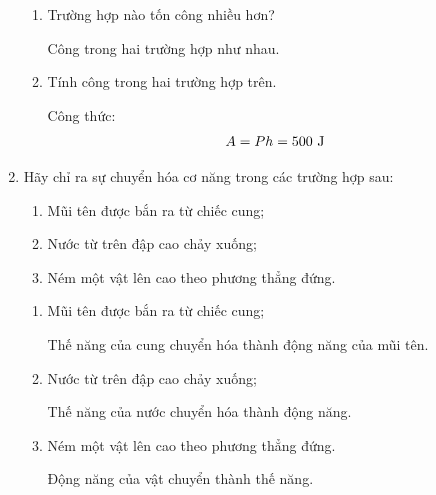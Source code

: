 \begin{enumerate}[label=\bfseries Câu \arabic*:]
{\begin{enumerate}
			Lợi bao nhiêu lần về lực thì thiệt bấy nhiêu lần về đường đi. Vậy trường hợp hai có lợi về lực hơn 2 lần so với trường hợp thứ nhất.
			
			\item Trường hợp nào tốn công nhiều hơn?
			
			Công trong hai trường hợp như nhau.
			
			\item Tính công trong hai trường hợp trên.
			
			Công thức: $$A=Ph=500\ \text J$$
		\end{enumerate}
	}
	\item {}
	
	
	{Hãy chỉ ra sự chuyển hóa cơ năng trong các trường hợp sau:
		\begin{enumerate}
			\item Mũi tên được bắn ra từ chiếc cung;
			\item Nước từ trên đập cao chảy xuống;
			\item Ném một vật lên cao theo phương thẳng đứng.
		\end{enumerate}
	}
	
	\hideall
	{
		\begin{enumerate}
			\item Mũi tên được bắn ra từ chiếc cung;
			
			Thế năng của cung chuyển hóa thành động năng của mũi tên.
			
			\item Nước từ trên đập cao chảy xuống;
			
			Thế năng của nước chuyển hóa thành động năng.
			
			\item Ném một vật lên cao theo phương thẳng đứng.
			
			Động năng của vật chuyển thành thế năng.
		\end{enumerate}
	}
\end{enumerate}